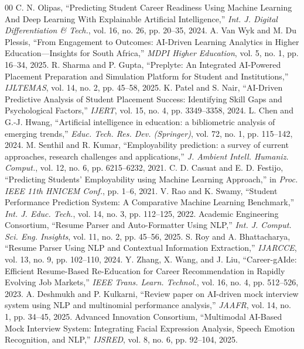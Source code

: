 \documentclass[conference]{IEEEtran}
\begin{document}
\begin{thebibliography}{00}
 C. N. Olipas, ``Predicting Student Career Readiness Using Machine Learning And Deep Learning With Explainable Artificial Intelligence,'' \textit{Int. J. Digital Differentiation \& Tech.}, vol. 16, no. 26, pp. 20--35, 2024.
 A. Van Wyk and M. Du Plessis, ``From Engagement to Outcomes: AI-Driven Learning Analytics in Higher Education---Insights for South Africa,'' \textit{MDPI Higher Education}, vol. 5, no. 1, pp. 16--34, 2025.
 R. Sharma and P. Gupta, ``Preplyte: An Integrated AI-Powered Placement Preparation and Simulation Platform for Student and Institutions,'' \textit{IJLTEMAS}, vol. 14, no. 2, pp. 45--58, 2025.
 K. Patel and S. Nair, ``AI-Driven Predictive Analysis of Student Placement Success: Identifying Skill Gaps and Psychological Factors,'' \textit{IJERT}, vol. 15, no. 4, pp. 3349--3358, 2024.
 L. Chen and G.-J. Hwang, ``Artificial intelligence in education: a bibliometric analysis of emerging trends,'' \textit{Educ. Tech. Res. Dev. (Springer)}, vol. 72, no. 1, pp. 115--142, 2024.
 M. Senthil and R. Kumar, ``Employability prediction: a survey of current approaches, research challenges and applications,'' \textit{J. Ambient Intell. Humaniz. Comput.}, vol. 12, no. 6, pp. 6215--6232, 2021.
 C. D. Casuat and E. D. Festijo, ``Predicting Students' Employability using Machine Learning Approach,'' in \textit{Proc. IEEE 11th HNICEM Conf.}, pp. 1--6, 2021.
 V. Rao and K. Swamy, ``Student Performance Prediction System: A Comparative Machine Learning Benchmark,'' \textit{Int. J. Educ. Tech.}, vol. 14, no. 3, pp. 112--125, 2022.
 Academic Engineering Consortium, ``Resume Parser and Auto-Formatter Using NLP,'' \textit{Int. J. Comput. Sci. Eng. Insights}, vol. 11, no. 2, pp. 45--56, 2025.
 S. Roy and A. Bhattacharya, ``Resume Parser Using NLP and Contextual Information Extraction,'' \textit{IJARCCE}, vol. 13, no. 9, pp. 102--110, 2024.
 Y. Zhang, X. Wang, and J. Liu, ``Career-gAIde: Efficient Resume-Based Re-Education for Career Recommendation in Rapidly Evolving Job Markets,'' \textit{IEEE Trans. Learn. Technol.}, vol. 16, no. 4, pp. 512--526, 2023.
 A. Deshmukh and P. Kulkarni, ``Review paper on AI-driven mock interview system using NLP and multinomial performance analysis,'' \textit{JAAFR}, vol. 14, no. 1, pp. 34--45, 2025.
 Advanced Innovation Consortium, ``Multimodal AI-Based Mock Interview System: Integrating Facial Expression Analysis, Speech Emotion Recognition, and NLP,'' \textit{IJSRED}, vol. 8, no. 6, pp. 92--104, 2025.

\end{thebibliography}
\end{document}
